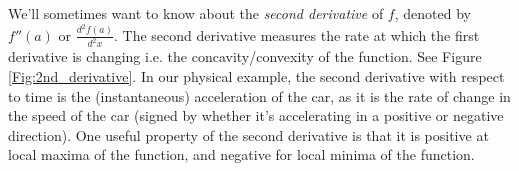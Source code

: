 We'll sometimes want to know about the  \emph{second derivative} of
$f$, denoted by $f''(a)$ or $\frac{d^2f(a)}{d^2x}$. 
The second
derivative measures the rate at which the first derivative is changing
i.e. the concavity/convexity of the function. See Figure \ref{Fig:2nd_derivative}.
In our physical example, the second derivative with respect to time is
the (instantaneous) acceleration of the car, as it is the rate of
change in the speed of the car (signed by
whether it's accelerating in a positive or negative direction). One
useful property of the second derivative is that it is positive at
local maxima of the function, and negative for local minima of the function.



